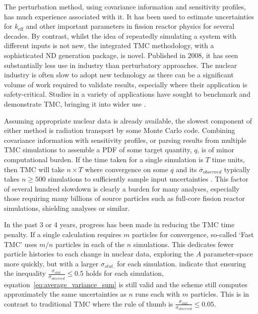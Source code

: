 The perturbation method, using covariance information and sensitivity profiles, has much experience associated with it. It has been used to estimate uncertainties for $k_\mathrm{eff}$ and other important parameters in fission reactor physics for several decades. By contrast, whilst the idea of repeatedly simulating a system with different inputs is not new, the integrated TMC methodology, with a sophisticated ND generation package, is novel. Published in 2008, it has seen substantially less use in industry than perturbatory approaches. The nuclear industry is often slow to adopt new technology as there can be a significant volume of work required to validate results, especially where their application is safety-critical. Studies in a variety of applications have sought to benchmark and demonstrate TMC, bringing it into wider use \cite{Koning2008}\cite{Rochman2010}\cite{Sjostrand2017}\cite{Koning2012}\cite{Alhassan2013}\cite{Alhassan2014}\cite{Rochman2011a}. 

Assuming appropriate nuclear data is already available, the slowest component of either method is radiation transport by some Monte Carlo code. Combining covariance information with sensitivity profiles, or parsing results from multiple TMC simulations to assemble a PDF of some target quantity, $q$, is of minor computational burden. If the time taken for a single simulation is $T$ time units, then TMC will take $n \times T$ where convergence on some $q$ and its $\overline{\sigma}_{observed}$ typically takes $n \geq 500$ simulations to sufficiently sample input uncertainties \cite{Rochman2014a}. This factor of several hundred slowdown is clearly a burden for many analyses, especially those requiring many billions of source particles such as full-core fission reactor simulations, shielding analyses or similar. 

In the past 3 or 4 years, progress has been made in reducing the TMC time penalty. If a single calculation requires $m$ particles for convergence, so-called `Fast TMC' uses $m/n$ particles in each of the $n$ simulations. This dedicates fewer particle histories to each change in nuclear data, exploring the $A$ parameter-space more quickly, but with a larger $\sigma_{stat.}$ for each simulation. \citeauthor{Rochman2014a} indicate that ensuring the inequality $\frac{\sigma_{stat.}}{\sigma_{observed}} \leq 0.5$ holds for each simulation, equation~\ref{eq:average_variance_sum} is still valid and the scheme still computes approximately the same uncertainties as $n$ runs each with $m$ particles. This is in contrast to traditional TMC where the rule of thumb is $\frac{\sigma_{stat.}}{\sigma_{observed}} \leq 0.05$.

